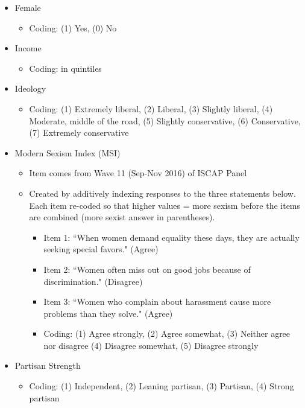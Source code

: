\documentclass[12pt]{article}
\begin{document}
\begin{appendices}
\begin{refsection}
\begin{itemize}
	\item Female
		\begin{itemize}
			\item Coding: (1) Yes, (0) No
		\end{itemize}
		
	\item Income
		\begin{itemize}
			\item Coding: in quintiles
		\end{itemize}
		
	\item Ideology 
		\begin{itemize}
			\item Coding: (1) Extremely liberal, (2) Liberal, (3) Slightly liberal, (4) Moderate, middle of the road, (5) Slightly conservative, (6) Conservative, (7) Extremely conservative 
		\end{itemize}
		
	\item Modern Sexism Index (MSI)
		\begin{itemize}
			\item Item comes from Wave 11 (Sep-Nov 2016) of ISCAP Panel
			\item Created by additively indexing responses to the three statements below. Each item re-coded so that higher values = more sexism before the items are combined (more sexist answer in parentheses). 
			\begin{itemize}
				\item Item 1: ``When women demand equality these days, they are actually seeking special favors." (Agree)
				\item Item 2: ``Women often miss out on good jobs because of discrimination." (Disagree)
				\item Item 3: ``Women who complain about harassment cause more problems than they solve." (Agree)
				\item Coding: (1) Agree strongly, (2) Agree somewhat, (3) Neither agree nor disagree (4) Disagree somewhat, (5) Disagree strongly
			\end{itemize}
		\end{itemize}
		
	\item Partisan Strength 
		\begin{itemize}
			\item Coding: (1) Independent, (2) Leaning partisan, (3) Partisan, (4) Strong partisan
		\end{itemize}
				

\end{itemize}
\end{refsection}
\end{appendices}
\end{document}
